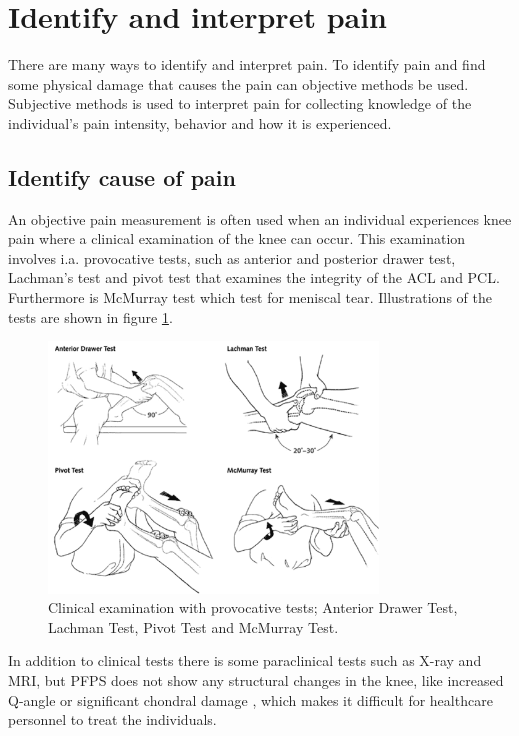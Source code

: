 \section{Identify and interpret pain}
There are many ways to identify and interpret pain. To identify pain and find some physical damage that causes the pain can objective methods be used. Subjective methods is used to interpret pain for collecting knowledge of the individual's pain intensity, behavior and how it is experienced.\citep{Younger2009}

\subsection{Identify cause of pain}
An objective pain measurement is often used when an individual experiences knee pain where a clinical examination of the knee can occur. This examination involves i.a. provocative tests, such as anterior and posterior drawer test, Lachman’s test and pivot test that examines the integrity of the ACL and PCL. Furthermore is McMurray test which test for meniscal tear.\citep{Ghosh2010} Illustrations of the tests are shown in figure \ref{fig:kneetest}.

\begin{figure} [H]
\centering
\includegraphics[width=0.78\textwidth]{figures/kneetest}
\caption{Clinical examination with provocative tests; Anterior Drawer Test, Lachman Test, Pivot Test and McMurray Test.\citep{Ghosh2010}}
\label{fig:kneetest}
\end{figure}


\noindent
In addition to clinical tests there is some paraclinical tests such as X-ray and MRI, but PFPS does not show any structural changes in the knee, like increased Q-angle or significant chondral damage \citep{Petersen2013}, which makes it difficult for healthcare personnel to treat the individuals. 

